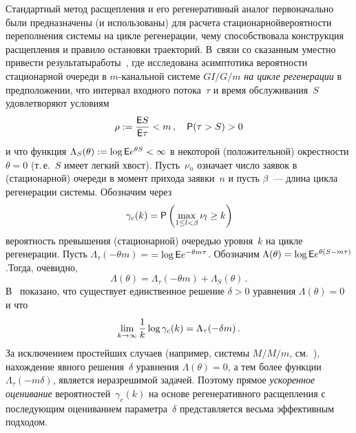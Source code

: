 \begin{multicols}{2}
  Стандартный метод расщепления и его регенеративный аналог  первоначально были предназначены (и
использованы) для расчета стационарной\linebreak вероятности переполнения
системы на цикле регенерации, чему способствовала  конструкция
расщепления и правило  остановки траекторий. В~связи со сказанным
уместно привести результаты\linebreak  работы~\cite {Sadowsky}, где
исследована асимптотика ве\-ро\-ят\-ности
  стационарной  очереди  в $m$-ка\-наль\-ной системе $GI/G/m$ {\it на цикле
  регенерации} в предположении, что
интервал входного потока~$\tau$ и время   обслуживания~$S$
удовлетворяют условиям
\begin{equation*}
\rho:=\displaystyle\frac{\displaystyle {\sf E} S\mathstrut}{\displaystyle {\sf E} \tau\mathstrut}<m\,,\quad {\sf P}(\tau>S)>0
\end{equation*}
и что функция $\Lambda_S(\theta):= \log {\sf E} e^{\theta S}<\infty$
 в некоторой  (положительной)
 окрестности $\theta=0$ (т.\,е.\ $S$ имеет  легкий хвост).
Пусть~$\nu_n$  означает  число заявок в (стационарной) очереди в
момент прихода заявки~$n$ и пусть $\beta $~---  длина цикла
регенерации системы. Обозначим через
$$
\gamma_c(k)={\sf P}\left(\max\limits_{1\le l< \beta} \nu_l\ge k\right)
$$
вероятность превышения (стационарной) очередью  уровня~$k$ на цикле
регенерации.
 Пусть $\Lambda_\tau(-\theta m)=$\linebreak $=\log {\sf E} e^{-\theta m\tau}$. Обозначим
$\Lambda(\theta)=\log{\sf E} e^{\theta(S- m\tau)}$.\linebreak  Тогда, очевидно,
$$
\Lambda(\theta)=\Lambda_\tau(-\theta m)+\Lambda_S(\theta)\,.
$$
В~\cite{Sadowsky} показано, что  существует единственное решение $\delta>0$
уравнения
 $
 \Lambda(\theta)
=0 $ и что
\begin{equation*}
\lim\limits_{k\to \infty}\displaystyle\frac{\displaystyle 1\mathstrut}{\displaystyle k\mathstrut}\log\gamma_c(k)=\Lambda_\tau(-\delta
m)\,. 
\end{equation*}
За исключением простейших случаев (например, системы $M/M/m$, см.~\cite{Morozov-asymptotics}), 
нахождение явного решения~$\delta$
уравнения $\Lambda(\theta)=0$, а тем более функции
$\Lambda_\tau(-m\delta )$, является неразрешимой задачей.
 Поэтому
    прямое {\it ускоренное  оценивание} вероятностей~$\gamma_c(k)$ 
    на основе регенеративного расщепления с последующим
оцениванием параметра~$\delta$ представляется весьма эффективным подходом.


\end{multicols}
